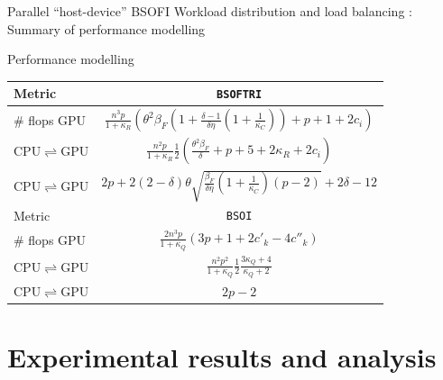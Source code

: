 \documentclass[xcolor=table,final]{beamer} %
\newcommand{\Bsoftri}{\texttt{BSOFTRI}\xspace}
\newcommand{\Bsoi}{\texttt{BSOI}\xspace}
\begin{document}
\begin{frame}{Parallel ``host-device'' BSOFI}{%
    Workload distribution and load balancing : Summary of performance modelling}
  \begin{block}{Performance modelling}
    \begin{center}
      \begin{tabular}{l|c}
        \toprule
        Metric & \Bsoftri\\
        \hline
        \# flops GPU 
        & $\frac{n^{3} p}{1 + \kappa_{R}} \left( 
        \theta^{2} \beta_F \left( 1 + \frac{\delta - 1 }{\delta \eta} \left( 1 + \frac{1}{\kappa_{C}} \right) \right) + {p + 1 + 2 c_{i}} \right)$\\
        CPU$\rightleftharpoons$GPU
        & $\frac{n^{2} p}{1 + \kappa_{R}} \frac{1}{2}\left(\frac{\theta^{2} \beta_F }{\delta} + {p + 5 + 2 \kappa_R + 2 c_{i}}\right)$\\
        CPU$\rightleftharpoons$GPU
        & $2 p + 2(2 - \delta) \theta {\sqrt{\frac{\beta_{F} }{ \delta \eta} \left(1 + \frac{1}{\kappa_{C}}\right) \left(p - 2\right) }} + 2 \delta - 12$\\
        \hline\hline
        Metric & \Bsoi  \\
        \hline
        \# flops GPU 
        & $\frac{2 n^{3} p}{1 + \kappa_{Q}} \left( 3 p + 1 + 2 c'_k - 4 c''_k\right)$\\
        CPU$\rightleftharpoons$GPU
        & $\frac{n^{2} p^{2}}{1 + \kappa_{Q}} \frac{1}{2} \frac{3 \kappa_{Q} + 4}{ \kappa_{Q} + 2}$ \\
        CPU$\rightleftharpoons$GPU
        & $2 p-2$ \\

        \bottomrule
      \end{tabular}
    \end{center}
  \end{block}
\end{frame}

\section{Experimental results and analysis}
\end{document}
